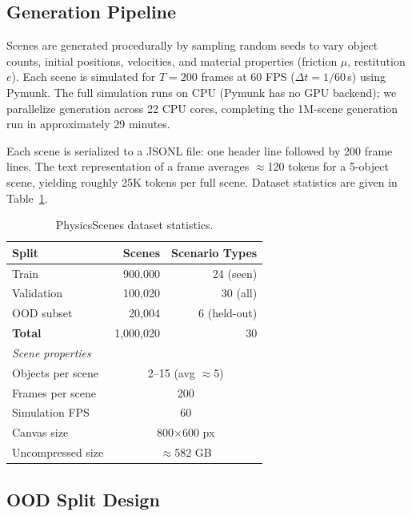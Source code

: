 \documentclass{article}
\begin{document}
\subsection{Generation Pipeline}

Scenes are generated procedurally by sampling random seeds to vary object counts,
initial positions, velocities, and material properties (friction $\mu$, restitution
$e$). Each scene is simulated for $T=200$ frames at 60 FPS ($\Delta t = 1/60$\,s)
using Pymunk. The full simulation runs on CPU (Pymunk has no GPU backend); we
parallelize generation across 22 CPU cores, completing the 1M-scene generation
run in approximately 29 minutes.

Each scene is serialized to a JSONL file: one header line followed by 200 frame
lines. The text representation of a frame averages $\approx$120 tokens for a
5-object scene, yielding roughly 25K tokens per full scene. Dataset statistics
are given in Table~\ref{tab:datastats}.

\begin{table}[t]
\centering
\caption{PhysicsScenes dataset statistics.}
\label{tab:datastats}
\small
\begin{tabular}{lrr}
\toprule
\textbf{Split} & \textbf{Scenes} & \textbf{Scenario Types} \\
\midrule
Train        & 900{,}000 & 24 (seen) \\
Validation   & 100{,}020 & 30 (all) \\
\quad OOD subset & 20{,}004 & 6 (held-out) \\
\midrule
\textbf{Total} & 1{,}000{,}020 & 30 \\
\midrule
\multicolumn{3}{l}{\textit{Scene properties}} \\
Objects per scene & \multicolumn{2}{c}{2--15 (avg $\approx$5)} \\
Frames per scene  & \multicolumn{2}{c}{200} \\
Simulation FPS    & \multicolumn{2}{c}{60} \\
Canvas size       & \multicolumn{2}{c}{800$\times$600 px} \\
Uncompressed size & \multicolumn{2}{c}{$\approx$582 GB} \\
\bottomrule
\end{tabular}
\end{table}

\subsection{OOD Split Design}
\end{document}
